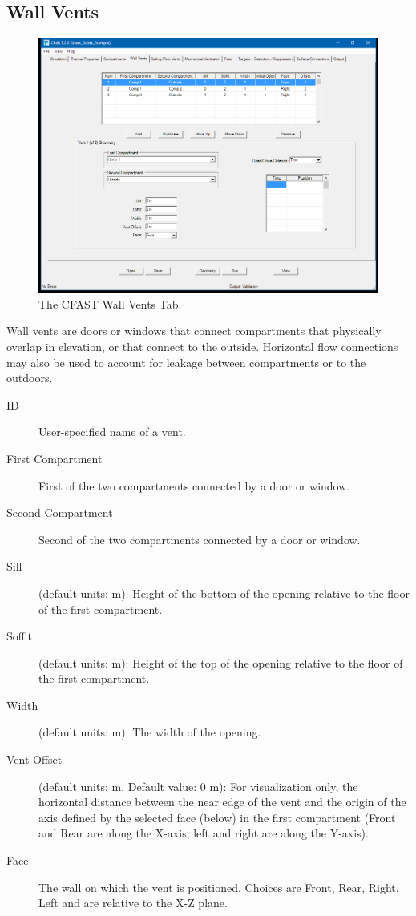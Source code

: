 \subsection{Wall Vents}
\label{info:VENT}
\begin{figure}[h!]
\begin{center}
\includegraphics[width=6.5in]{FIGURES/Natural_Flow_Tab}
\caption[The CFAST Wall Vents Tab]{The CFAST Wall Vents Tab.}
\end{center}
\end{figure}

Wall vents are doors or windows that connect compartments that physically overlap in elevation, or that connect to the outside. Horizontal flow connections may also be used to account for leakage between compartments or to the outdoors.

\begin{description}
\item[ID] User-specified name of a vent.
\item[First Compartment] First of the two compartments connected by a door or window.
\item[Second Compartment] Second of the two compartments connected by a door or window.
\item[Sill] (default units: m): Height of the bottom of the opening relative to the floor of the first compartment.
\item[Soffit] (default units: m): Height of the top of the opening relative to the floor of the first compartment.
\item[Width] (default units: m): The width of the opening.
\item[Vent Offset] (default units: m, Default value: 0 m): For visualization only, the horizontal distance between the near edge of the vent and the origin of the axis defined by the selected face (below) in the first compartment (Front and Rear are along the X-axis; left and right are along the Y-axis).
\item[Face] The wall on which the vent is positioned.  Choices are Front, Rear, Right, Left and are relative to the X-Z plane.
\end{description}

